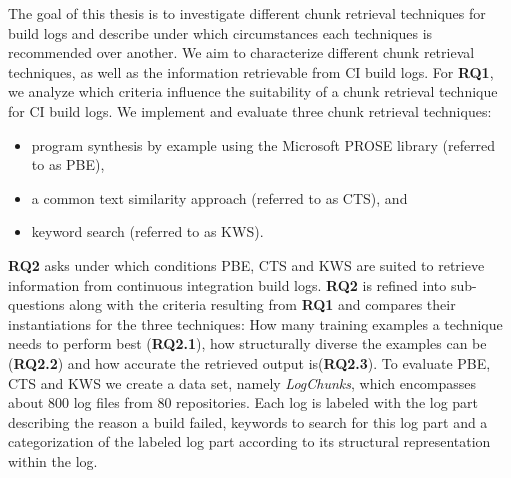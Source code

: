 \documentclass[\myrootdir/main.tex]{subfiles}
\begin{document}
The goal of this thesis is to investigate different chunk retrieval techniques for build logs and describe under which circumstances each techniques is recommended over another.
We aim to characterize different chunk retrieval techniques, as well as the information retrievable from CI build logs.
For \textbf{RQ1}, we analyze which criteria influence the suitability of a chunk retrieval technique for CI build logs.
We implement and evaluate three chunk retrieval techniques:
\begin{itemize}
  \item program synthesis by example using the Microsoft PROSE library (referred to as PBE),
  \item a common text similarity approach (referred to as CTS), and
  \item keyword search (referred to as KWS).
\end{itemize}
\textbf{RQ2} asks under which conditions PBE, CTS and KWS are suited to retrieve information from continuous integration build logs.
\textbf{RQ2} is refined into sub-questions along with the criteria resulting from \textbf{RQ1} and compares their instantiations for the three techniques:
How many training examples a technique needs to perform best (\textbf{RQ2.1}), how structurally diverse the examples can be (\textbf{RQ2.2}) and how accurate the retrieved output is(\textbf{RQ2.3}).
To evaluate PBE, CTS and KWS we create a data set, namely \emph{LogChunks}, which encompasses about 800 log files from 80 repositories.
Each log is labeled with the log part describing the reason a build failed, keywords to search for this log part and a categorization of the labeled log part according to its structural representation within the log.
\end{document}
